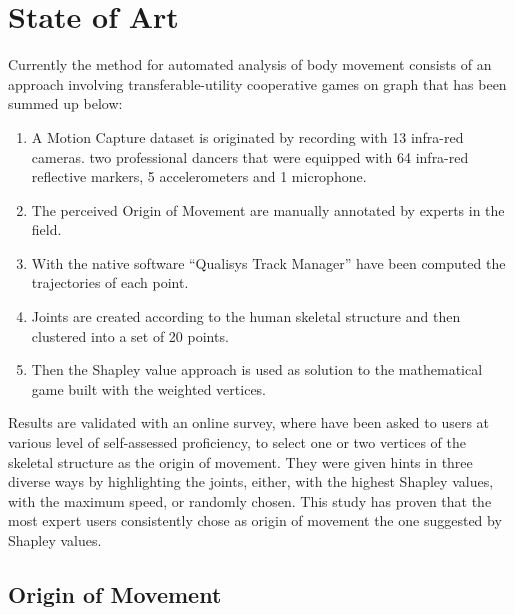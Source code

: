 \chapter{State of Art}
Currently the method for automated analysis of body movement consists of an approach involving transferable-utility cooperative games on graph \cite{kolykhalova:2020} that has been summed up below:  
\begin{enumerate}
    \item {A Motion Capture dataset is originated by recording with 13 infra-red cameras. two professional dancers that were equipped with 64 infra-red reflective markers, 5 accelerometers and 1 microphone.} 
    \item{The perceived Origin of Movement are manually annotated by experts in the field.} 
    \item{With the native software “Qualisys Track Manager” have been computed the trajectories of each point.}  
    \item{Joints are created according to the human skeletal structure and then clustered into a set of 20 points.} 
    \item{Then the Shapley value approach is used as solution to the mathematical game built with the weighted vertices.} 
\end{enumerate}
Results are validated with an online survey, where have been asked to users at various level of self-assessed proficiency, 
to select one or two vertices of the skeletal structure as the origin of movement.
They were given hints in three diverse ways by highlighting the joints, either, 
with the highest Shapley values, with the maximum speed, or randomly chosen. 
This study has proven that the most expert users consistently chose as 
origin of movement the one suggested by Shapley values. 

\section{Origin of Movement}